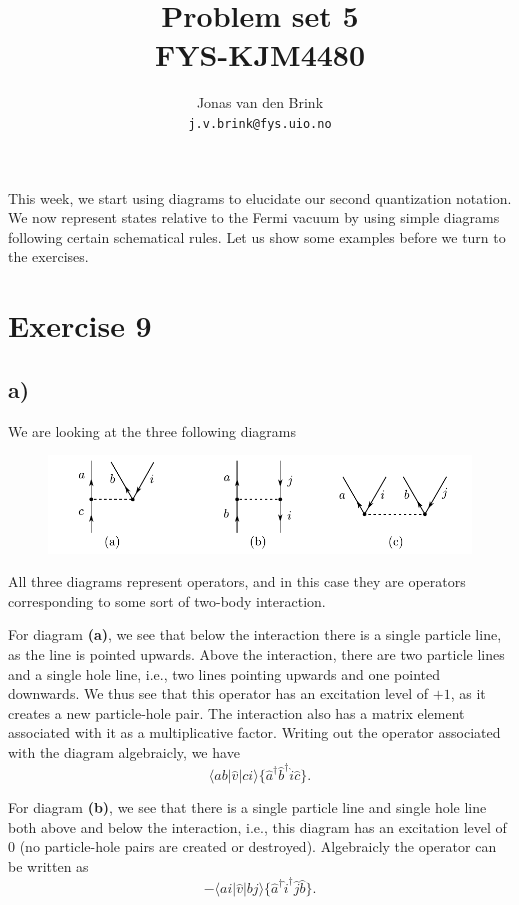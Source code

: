 \documentclass[a4paper, 11pt, notitlepage, english]{article}
\author{Jonas van den Brink \\ \texttt{j.v.brink@fys.uio.no}}
\title{Problem set 5 \\ FYS-KJM4480}
\newcommand{\op}[1]{\hat{#1}}
\newcommand{\braopket}[3]{\langle #1 | {#2} | #3 \rangle}
\begin{document}
\maketitle

This week, we start using diagrams to elucidate our second quantization notation. We now represent states relative to the Fermi vacuum by using simple diagrams following certain schematical rules. Let us show some examples before we turn to the exercises.

\section*{Exercise 9}
\subsection*{a)}

We are looking at the three following diagrams
\begin{figure}[h!]
	\centering
	\includegraphics[width=\textwidth]{exercise9a}
\end{figure}

All three diagrams represent operators, and in this case they are operators corresponding to some sort of two-body interaction.

For diagram \textbf{(a)}, we see that below the interaction there is a single particle line, as the line is pointed upwards. Above the interaction, there are two particle lines and a single hole line, i.e., two lines pointing upwards and one pointed downwards. We thus see that this operator has an excitation level of $+1$, as it creates a new particle-hole pair. The interaction also has a matrix element associated with it as a multiplicative factor. Writing out the operator associated with the diagram algebraicly, we have 
$$\braopket{ab}{\op{v}}{ci}\{\op{a}^\dagger\op{b}^\dagger\op{i}\op{c}\}.$$

For diagram \textbf{(b)}, we see that there is a single particle line and single hole line both above and below the interaction, i.e., this diagram has an excitation level of 0 (no particle-hole pairs are created or destroyed). Algebraicly the operator can be written as
$$-\braopket{ai}{\op{v}}{bj}\{\op{a}^\dagger\op{i}^\dagger\op{j}\op{b}\}.$$
\end{document}
